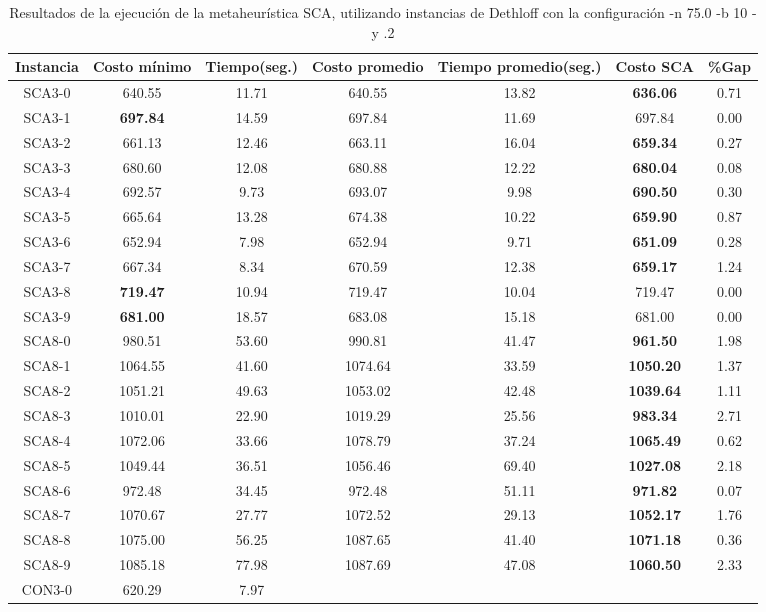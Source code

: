 \begin{table}[ht]
\caption{Resultados de la ejecución de la metaheurística SCA, utilizando instancias de Dethloff con la configuración -n 75.0 -b 10 -y .2}
\centering
\small
\begin{tabular}{c c c c c c c}
\hline\hline
Instancia & Costo mínimo & Tiempo(seg.) & Costo promedio & Tiempo promedio(seg.) & Costo SCA & \%Gap \\ [0.5ex]
\hline
SCA3-0 & 640.55 & 11.71 & 
640.55 & 13.82 & \bf{636.06} & 
0.71\\SCA3-1 & \bf{697.84} & 14.59 & 
697.84 & 11.69 & 697.84 & 0.00\\
SCA3-2 & 661.13 & 12.46 & 
663.11 & 16.04 & \bf{659.34} & 
0.27\\SCA3-3 & 680.60 & 12.08 & 
680.88 & 12.22 & \bf{680.04} & 
0.08\\SCA3-4 & 692.57 & 9.73 & 
693.07 & 9.98 & \bf{690.50} & 
0.30\\SCA3-5 & 665.64 & 13.28 & 
674.38 & 10.22 & \bf{659.90} & 
0.87\\SCA3-6 & 652.94 & 7.98 & 
652.94 & 9.71 & \bf{651.09} & 
0.28\\SCA3-7 & 667.34 & 8.34 & 
670.59 & 12.38 & \bf{659.17} & 
1.24\\SCA3-8 & \bf{719.47} & 10.94 & 
719.47 & 10.04 & 719.47 & 0.00\\
SCA3-9 & \bf{681.00} & 18.57 & 
683.08 & 15.18 & 681.00 & 0.00\\
SCA8-0 & 980.51 & 53.60 & 
990.81 & 41.47 & \bf{961.50} & 
1.98\\SCA8-1 & 1064.55 & 41.60 & 
1074.64 & 33.59 & \bf{1050.20} & 
1.37\\SCA8-2 & 1051.21 & 49.63 & 
1053.02 & 42.48 & \bf{1039.64} & 
1.11\\SCA8-3 & 1010.01 & 22.90 & 
1019.29 & 25.56 & \bf{983.34} & 
2.71\\SCA8-4 & 1072.06 & 33.66 & 
1078.79 & 37.24 & \bf{1065.49} & 
0.62\\SCA8-5 & 1049.44 & 36.51 & 
1056.46 & 69.40 & \bf{1027.08} & 
2.18\\SCA8-6 & 972.48 & 34.45 & 
972.48 & 51.11 & \bf{971.82} & 
0.07\\SCA8-7 & 1070.67 & 27.77 & 
1072.52 & 29.13 & \bf{1052.17} & 
1.76\\SCA8-8 & 1075.00 & 56.25 & 
1087.65 & 41.40 & \bf{1071.18} & 
0.36\\SCA8-9 & 1085.18 & 77.98 & 
1087.69 & 47.08 & \bf{1060.50} & 
2.33\\CON3-0 & 620.29 & 7.97 & 

\end{tabular}
\end{table}
